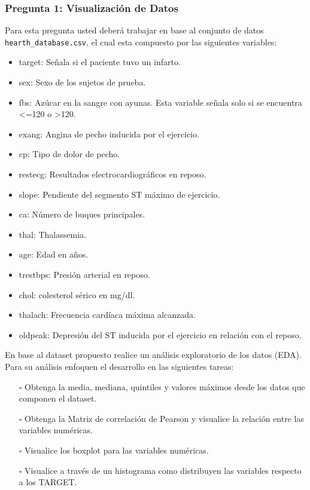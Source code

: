 \documentclass[]{article}
\providecommand{\tightlist}{%
  \setlength{\itemsep}{0pt}\setlength{\parskip}{0pt}}
\begin{document}
\hypertarget{pregunta-1-visualizacion-de-datos}{%
\subsubsection{Pregunta 1: Visualización de
Datos}\label{pregunta-1-visualizacion-de-datos}}

Para esta pregunta usted deberá trabajar en base al conjunto de datos
\texttt{hearth\_database.csv}, el cual esta compuesto por las siguientes
variables:

\begin{itemize}
\tightlist
\item
  target: Señala si el paciente tuvo un infarto.
\item
  sex: Sexo de los sujetos de prueba.
\item
  fbs: Azúcar en la sangre con ayunas. Esta variable señala solo si se
  encuentra \textless=120 o \textgreater120.
\item
  exang: Angina de pecho inducida por el ejercicio.
\item
  cp: Tipo de dolor de pecho.
\item
  restecg: Resultados electrocardiográficos en reposo.
\item
  slope: Pendiente del segmento ST máximo de ejercicio.
\item
  ca: Número de buques principales.
\item
  thal: Thalassemia.
\item
  age: Edad en años.
\item
  trestbps: Presión arterial en reposo.
\item
  chol: colesterol sérico en mg/dl.
\item
  thalach: Frecuencia cardíaca máxima alcanzada.
\item
  oldpeak: Depresión del ST inducida por el ejercicio en relación con el
  reposo.
\end{itemize}

En base al dataset propuesto realice un análisis exploratorio de los
datos (EDA). Para su análisis enfoquen el desarrollo en las siguientes
tareas:

\begin{itemize}
\tightlist
\item[$\square$]
  Obtenga la media, mediana, quintiles y valores máximos desde los datos
  que componen el dataset.
\item[$\square$]
  Obtenga la Matriz de correlación de Pearson y visualice la relación
  entre las variables numéricas.
\item[$\square$]
  Visualice los boxplot para las variables numéricas.
\item[$\square$]
  Visualice a través de un histograma como distribuyen las variables
  respecto a los TARGET.
\end{itemize}
\end{document}
